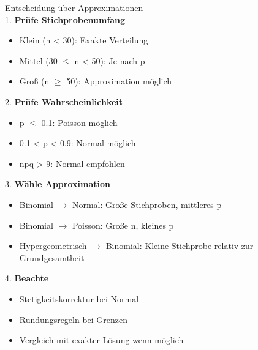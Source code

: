 \begin{KR}{Entscheidung über Approximationen}\\
1. \textbf{Prüfe Stichprobenumfang}
   \begin{itemize}
   \item Klein (n < 30): Exakte Verteilung
   \item Mittel (30 $\leq$ n < 50): Je nach p
   \item Groß (n $\geq$ 50): Approximation möglich
   \end{itemize}

2. \textbf{Prüfe Wahrscheinlichkeit}
   \begin{itemize}
   \item p $\leq$ 0.1: Poisson möglich
   \item 0.1 < p < 0.9: Normal möglich
   \item npq > 9: Normal empfohlen
   \end{itemize}

3. \textbf{Wähle Approximation}
   \begin{itemize}
   \item Binomial $\rightarrow$ Normal: Große Stichproben, mittleres p
   \item Binomial $\rightarrow$ Poisson: Große n, kleines p
   \item Hypergeometrisch $\rightarrow$ Binomial: Kleine Stichprobe relativ zur Grundgesamtheit
   \end{itemize}

4. \textbf{Beachte}
   \begin{itemize}
   \item Stetigkeitskorrektur bei Normal
   \item Rundungsregeln bei Grenzen
   \item Vergleich mit exakter Lösung wenn möglich
   \end{itemize}
\end{KR}

